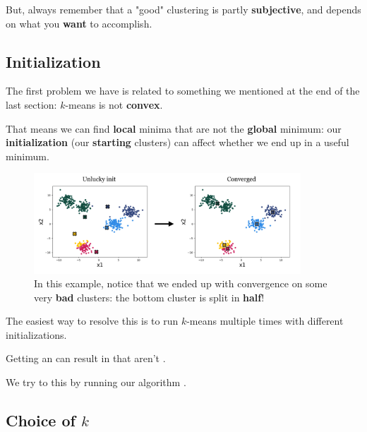     But, always remember that a "good" clustering is partly \textbf{subjective}, and depends on what you \textbf{want} to accomplish.

    \subsection*{Initialization}
    
        The first problem we have is related to something we mentioned at the end of the last section: $k$-means is not \textbf{convex}. 
        
        That means we can find \textbf{local} minima that are not the \textbf{global} minimum: our \textbf{initialization} (our \textbf{starting} clusters) can affect whether we end up in a useful minimum.
            
        \begin{figure}[H]
            \centering
            \includegraphics[width=100mm,scale=0.4]{images/clustering_images/unlucky_init.png}
            \caption*{In this example, notice that we ended up with convergence on some very \textbf{bad} clusters: the bottom cluster is split in \textbf{half}!}
        \end{figure}
        
        The easiest way to resolve this is to run $k$-means multiple times with different initializations.
            \\
        
        \begin{concept}
            Getting an  can result in  that aren't .
            
            We try to  this by running our algorithm .
        \end{concept}
        
        
    \subsection*{Choice of $k$}
    
